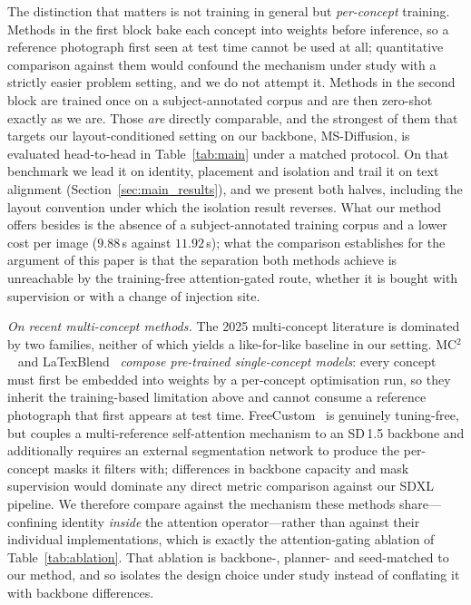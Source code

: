 \documentclass[10pt,twocolumn,letterpaper]{article}
\begin{document}
\noindent
The distinction that matters is not training in general but \emph{per-concept}
training.  Methods in the first block bake each concept into weights before
inference, so a reference photograph first seen at test time cannot be used at
all; quantitative comparison against them would confound the mechanism under
study with a strictly easier problem setting, and we do not attempt it.
Methods in the second block are trained once on a subject-annotated corpus and
are then zero-shot exactly as we are.  Those \emph{are} directly comparable,
and the strongest of them that targets our layout-conditioned setting on our
backbone, MS-Diffusion, is evaluated head-to-head in Table~\ref{tab:main}
under a matched protocol.  On that benchmark we lead it on identity,
placement and isolation and trail it on text alignment
(Section~\ref{sec:main_results}), and we present both halves, including the
layout convention under which the isolation result reverses.  What our method
offers besides is the absence of a subject-annotated training corpus and a
lower cost per image ($9.88$\,s against $11.92$\,s); what the comparison
establishes for the argument of this paper is that
the separation both methods achieve is unreachable by the training-free
attention-gated route, whether it is bought with supervision or with a change
of injection site.

\noindent\textit{On recent multi-concept methods.}
The 2025 multi-concept literature is dominated by two families, neither
of which yields a like-for-like baseline in our setting.
MC$^2$~\cite{mc2_2025} and LaTexBlend~\cite{latexblend2025} \emph{compose
pre-trained single-concept models}: every concept must first be embedded
into weights by a per-concept optimisation run, so they inherit the
training-based limitation above and cannot consume a reference photograph
that first appears at test time.
FreeCustom~\cite{freecustom2024} is genuinely tuning-free, but couples a
multi-reference self-attention mechanism to an SD\,1.5 backbone and
additionally requires an external segmentation network to produce the
per-concept masks it filters with; differences in backbone capacity and
mask supervision would dominate any direct metric comparison against our
SDXL pipeline.
We therefore compare against the mechanism these methods share---confining
identity \emph{inside} the attention operator---rather than against their
individual implementations, which is exactly the attention-gating ablation
of Table~\ref{tab:ablation}.  That ablation is backbone-, planner- and
seed-matched to our method, and so isolates the design choice under study
instead of conflating it with backbone differences.
\end{document}
